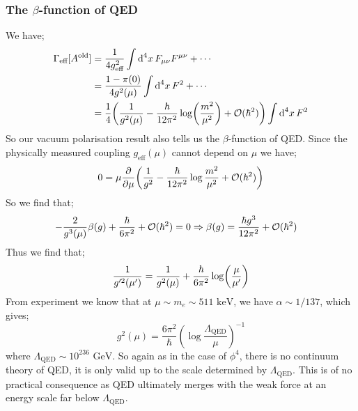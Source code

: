 \subsubsection{The $\beta$-function of QED}
We have;
\begin{align*}
\Gamma_{\text{eff}}[A^{\text{old}}] &= \frac{1}{4g_{\text{eff}}^2}\int{\upd{^4 x}F_{\mu\nu}F^{\mu\nu}} + \cdots \\
&= \frac{1 - \pi(0)}{4g^2(\mu)}\int{\upd{^4 x} F^2 + \cdots} \\
&= \frac{1}{4}\left(\frac{1}{g^2(\mu)} - \frac{\hbar}{12\pi^2}\log\left(\frac{m^2}{\mu^2}\right) + \mO(\hbar^2)\right)\int{\upd{^4 x}F^2}
\end{align*}
So our vacuum polarisation result also tells us the $\beta$-function of QED. Since the physically measured coupling $g_{\text{eff}}(\mu)$ cannot depend on $\mu$ we have;
\begin{equation*}
0 = \mu\frac{\del}{\del \mu}\left(\frac{1}{g^2} - \frac{\hbar}{12\pi^2} \log\frac{m^2}{\mu^2} + \mO(\hbar^2)\right)
\end{equation*}
So we find that;
\begin{align*}
-\frac{2}{g^3(\mu)}\beta(g) + \frac{\hbar}{6\pi^2} + \mathcal{O}(\hbar^2) &= 0 \Rightarrow \beta(g) = \frac{\hbar g^3}{12\pi^2} + \mathcal{O}(\hbar^2)
\end{align*}
Thus we find that;
\begin{equation}
\frac{1}{g^{\prime 2}(\mu\pr)} = \frac{1}{g^2(\mu)} + \frac{\hbar}{6\pi^2}\log\left(\frac{\mu}{\mu\pr}\right)
\end{equation}
From experiment we know that at $\mu \sim m_e \sim 511 \,\,\text{keV}$, we have $\alpha \sim 1/137$, which gives;
\begin{equation*}
g^2(\mu) = \frac{6\pi^2}{\hbar} (\log\frac{\Lambda_{\text{QED}}}{\mu})^{-1}
\end{equation*}
where $\Lambda_{\text{QED}} \sim 10^{236}\,\,\text{GeV}$. So again as in the case of $\phi^4$, there is no continuum theory of QED, it is only valid up to the scale determined by $\Lambda_{\text{QED}}$. This is of no practical consequence as QED ultimately merges with the weak force at an energy scale far below $\Lambda_{\text{QED}}$.
\newpage
